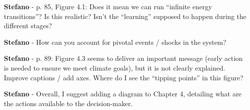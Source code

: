 \documentclass[12pt,a4paper]{article}
\begin{document}
\noindent 

\begin{mdframed}[style=manuscript] %

\end{mdframed}

\begin{mdframed}[style=comment] %
{\color{orange} \textbf{Stefano}} - p. 85, Figure 4.1: Does it mean we can run ``infinite energy transitions''? Is this realistic? Isn’t the ``learning'' supposed to happen during the different stages?
\end{mdframed}

\noindent 

\begin{mdframed}[style=manuscript] %

\end{mdframed}

\begin{mdframed}[style=comment] %
{\color{orange} \textbf{Stefano}} - How can you account for pivotal events / shocks in the system?
\end{mdframed}

\noindent 

\begin{mdframed}[style=manuscript] %

\end{mdframed}

\begin{mdframed}[style=comment] %
{\color{orange} \textbf{Stefano}} - p. 89: Figure 4.3 seems to deliver an important message (early action is needed to ensure we meet climate goals), but it is not clearly explained. Improve captions / add axes. 	Where do I see the ``tipping points'' in this figure?
\end{mdframed}

\noindent 

\begin{mdframed}[style=manuscript] %

\end{mdframed}

\begin{mdframed}[style=comment] %
{\color{orange} \textbf{Stefano}} - Overall, I suggest adding a diagram to Chapter 4, detailing what are the actions available to the decision-maker.
\end{mdframed}
\end{document}
